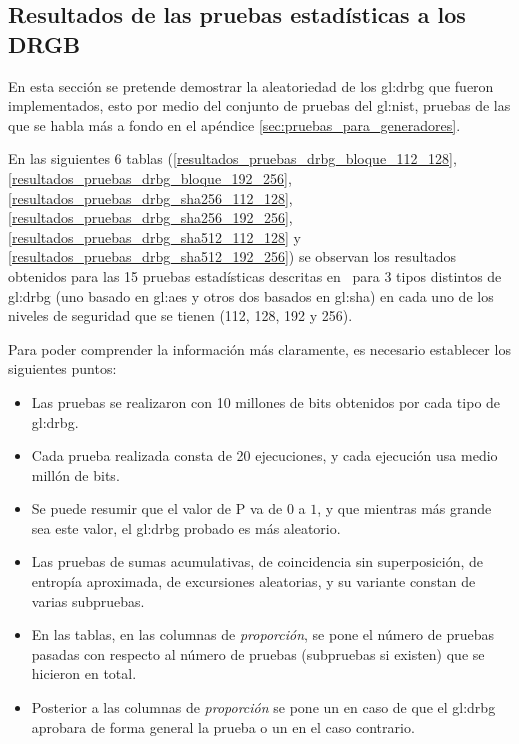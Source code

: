 %
%

\subsection{Resultados de las pruebas estadísticas a los DRGB}
\label{sec:resultados_pruebas_estadisticas_drgb}

En esta sección se pretende demostrar la aleatoriedad de los \gls{gl:drbg}
que fueron implementados, esto por medio del conjunto de pruebas del
\gls{gl:nist}, pruebas de las que se habla más a fondo en el apéndice
\ref{sec:pruebas_para_generadores}.

En las siguientes 6 tablas
(\ref{resultados_pruebas_drbg_bloque_112_128},
\ref{resultados_pruebas_drbg_bloque_192_256},
\ref{resultados_pruebas_drbg_sha256_112_128},
\ref{resultados_pruebas_drbg_sha256_192_256},
\ref{resultados_pruebas_drbg_sha512_112_128} y
\ref{resultados_pruebas_drbg_sha512_192_256})
se observan los resultados obtenidos para las 15 pruebas estadísticas
descritas en~\cite{nist_pruebas} para 3 tipos distintos de \gls{gl:drbg}
(uno basado en \gls{gl:aes} y otros dos basados en \gls{gl:sha}) en cada
uno de los niveles de seguridad que se tienen (112, 128, 192 y 256).

Para poder comprender la información más claramente, es necesario establecer
los siguientes puntos:

\begin{itemize}

  \item Las pruebas se realizaron con 10 millones de bits obtenidos por cada
    tipo de \gls{gl:drbg}.

  \item Cada prueba realizada consta de 20 ejecuciones, y cada ejecución usa
    medio millón de bits.

  \item Se puede resumir que el valor de P va de $0$ a $1$, y que mientras
    más grande sea este valor, el \gls{gl:drbg} probado es más aleatorio.

  \item Las pruebas de sumas acumulativas, de coincidencia sin superposición,
    de entropía aproximada, de excursiones aleatorias, y su variante constan
    de varias subpruebas.

  \item En las tablas, en las columnas de \textit{proporción}, se pone el
    número de pruebas pasadas con respecto al número de pruebas (subpruebas
    si existen) que se hicieron en total.

  \item Posterior a las columnas de \textit{proporción} se pone un 
    en caso de que el \gls{gl:drbg} aprobara de forma general la prueba o un
     en el caso contrario.

\end{itemize}


